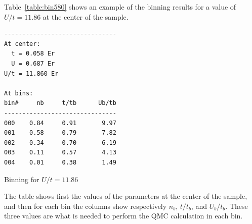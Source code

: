 \documentclass[11pt,letter]{article}
\begin{document}
Table~\ref{table:bin580} shows an example of the binning results for a value
of $U/t = 11.86$ at the center of the sample.
\begin{table}
\centering
\begin{minipage}[b][10em][b]{0.36\textwidth}
\begin{verbatim}
-------------------------------
At center:
  t = 0.058 Er
  U = 0.687 Er
U/t = 11.860 Er

At bins:
bin#     nb     t/tb      Ub/tb     
-------------------------------
000    0.84     0.91       9.97
001    0.58     0.79       7.82
002    0.34     0.70       6.19
003    0.11     0.57       4.13
004    0.01     0.38       1.49
\end{verbatim}
\end{minipage}
\caption[Binning for $U/t=11.86$]{Binning for $U/t=11.86$}
\label{table:bin580} 
\end{table}
The table shows first the values of the parameters at the center of the sample,
and then for each bin the columns show respectively $n_{b}$, $t/t_{b}$, and
$U_{b}/t_{b}$.   These three values are what is needed to perform the QMC
calculation in each bin.  
\end{document}
